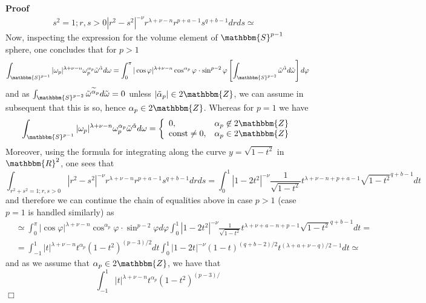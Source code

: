 \documentclass[12pt]{article}
\newcommand{\nin}{\not\in}
\newcommand{\tmop}[1]{\ensuremath{\operatorname{#1}}}
\renewenvironment{proof}{\noindent\textbf{Proof\ }}{\hspace*{\fill}$\Box$\medskip}
\theoremstyle{remark}
\begin{document}
\begin{proof}
\begin{eqnarray}
{    s^2 = 1 ; r, s > 0} | r^2 - s^2 |^{- \nu} r^{\lambda + \nu - n} r^{p + a -
    1} s^{q + b - 1} d r d s \simeq &  \nonumber
  \end{eqnarray}
  Now, inspecting the expression for the volume element of $\mathbbm{S}^{p -
  1}$ sphere, one concludes that for $p > 1$
  \[ \int_{\mathbbm{S}^{p - 1}} | \omega_p |^{\lambda + \nu - n}
     \omega^{\alpha_p}_p \tilde{\omega}^{\tilde{\alpha}} d \omega =
     \int_0^{\pi} | \cos \varphi |^{\lambda + \nu - n} \cos^{\alpha_p}
     \varphi^{} \cdot \sin^{p - 2} \varphi \left[ \int_{\mathbbm{S}^{p - 2}}
     \tilde{\omega}^{\tilde{\alpha}} d \tilde{\omega} \right] d \varphi \]
  and as $\int_{\mathbbm{S}^{p - 2}} \tilde{\omega}^{\widetilde{\alpha}_p}
  d \tilde{\omega} = 0$ unless $| \tilde{\alpha}_p | \in 2\mathbbm{Z}$, we can
  assume in subsequent that this is so, hence $\alpha_p \in 2\mathbbm{Z}$.
  Whereas for $p = 1$ we have
  \[ \int_{\mathbbm{S}^{p - 1}} | \omega_p |^{\lambda + \nu - n}
     \omega^{\alpha_p}_p \tilde{\omega}^{\tilde{\alpha}} d \omega = \left\{
     \begin{array}{ll}
       0, & \alpha_p \nin 2\mathbbm{Z}\\
       \tmop{const} \neq 0, & \alpha_p \in 2\mathbbm{Z}
     \end{array} \right. \]
  Moreover, using the formula for integrating along the curve $y = \sqrt{1 -
  t^2}$ in $\mathbbm{R}^2$, one sees that
  \[ \int_{r^2 + s^2 = 1 ; r, s > 0} | r^2 - s^2 |^{- \nu} r^{\lambda + \nu -
     n} r^{p + a - 1} s^{q + b - 1} d r d s = \int_0^1 | 1 - 2 t^2 |^{- \nu}
     \frac{1}{\sqrt{1 - t^2}} t^{\lambda + \nu - n + p + a - 1} \sqrt{1 -
     t^2}^{q + b - 1} d t \]
  and therefore we can continue the chain of equalities above in case $p > 1$
  (case $p = 1$ is handled similarly) as
  \begin{eqnarray}
    & \simeq \int_0^{\pi} | \cos \varphi |^{\lambda + \nu - n}
    \cos^{\alpha_p} \varphi^{} \cdot \sin^{p - 2} \varphi d \varphi \int_0^1 |
    1 - 2 t^2 |^{- \nu} \frac{1}{\sqrt{1 - t^2}} t^{\lambda + \nu + a - n + p
    - 1} \sqrt{1 - t^2}^{q + b - 1} d t = &  \nonumber\\
    & = \int_{- 1}^1 | t |^{\lambda + \nu - n} t^{\alpha_p} (1 - t^2)^{(p -
    3) / 2} d t \int_0^1 | 1 - 2 t |^{- \nu} (1 - t)^{(q + b - 2) / 2}
    t^{(\lambda + a + \nu - q) / 2 - 1} d t \simeq &  \nonumber
  \end{eqnarray}
  and as we assume that $\alpha_p \in 2\mathbbm{Z}$, we have that
  \[ \int_{- 1}^1 | t |^{\lambda + \nu - n} t^{\alpha_p} (1 - t^2)^{(p - 3) /
}\]
\end{proof}
\end{document}
